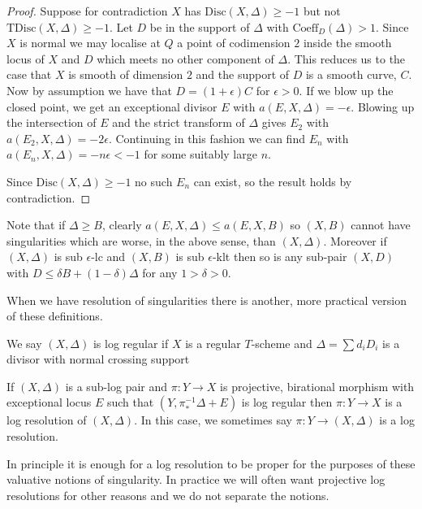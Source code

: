 \documentclass[a4paper,12pt]{book}
\begin{document}
\begin{proof}
	Suppose for contradiction $X$ has $\text{Disc}(X,\Delta) \geq -1$ but not $\text{TDisc}(X,\Delta) \geq -1$. Let $D$ be in the support of $\Delta$ with $\text{Coeff}_{D}(\Delta) > 1$. Since $X$ is normal we may localise at $Q$ a point of codimension $2$ inside the smooth locus of $X$ and $D$ which meets no other component of $\Delta$. This reduces us to the case that $X$ is smooth of dimension $2$ and the support of $D$ is a smooth curve, $C$. Now by assumption we have that $D=(1+\epsilon)C$ for $\epsilon > 0$. If we blow up the closed point, we get an exceptional divisor $E$ with $a(E,X,\Delta)=-\epsilon$. Blowing up the intersection of $E$ and the strict transform of $\Delta$ gives $E_{2}$ with $a(E_{2},X,\Delta)=-2\epsilon$. Continuing in this fashion we can find $E_{n}$ with $a(E_{n},X,\Delta)=-n\epsilon< -1$ for some suitably large $n$.

Since $\text{Disc}(X,\Delta) \geq -1$ no such $E_{n}$ can exist, so the result holds by contradiction.
\end{proof}

Note that if $\Delta \geq B$, clearly $a(E,X,\Delta) \leq a(E,X,B)$ so $(X,B)$ cannot have singularities which are worse, in the above sense, than $(X,\Delta)$. Moreover if $(X,\Delta)$ is sub $\epsilon$-lc and $(X,B)$ is sub $\epsilon$-klt then so is any sub-pair  $(X,D)$ with $D \leq \delta B+(1-\delta)\Delta$ for any $1>\delta >0$.

When we have resolution of singularities there is another, more practical version of these definitions.

\begin{definition}
	
	We say $(X,\Delta)$ is log regular if $X$ is a regular $T$-scheme and $\Delta=\sum d_{i}D_{i}$ is a divisor with normal crossing support
	
	If $(X,\Delta)$ is a sub-log pair and $\pi:Y \to X$ is projective, birational morphism with exceptional locus $E$ such that $(Y,\pi^{-1}_{*}\Delta+E)$ is log regular then $\pi:Y\to X$ is a log resolution of $(X,\Delta)$. In this case, we sometimes say $\pi:Y \to (X,\Delta)$ is a log resolution.
	
\end{definition}

\begin{remark}
	
	In principle it is enough for a log resolution to be proper for the purposes of these valuative notions of singularity. In practice we will often want projective log resolutions for other reasons and we do not separate the notions.
	
	\end{remark}
\end{document}
